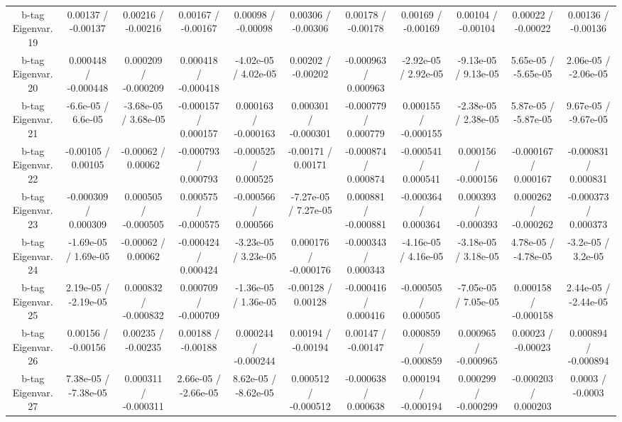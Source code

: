 \begin{table}[htbp]
\begin{center}
\begin{tabular}{|c|c|c|c|c|c|c|c|c|c|c|}
  b-tag Eigenvar. 19 & 0.00137 / -0.00137 & 0.00216 / -0.00216 & 0.00167 / -0.00167 & 0.00098 / -0.00098 & 0.00306 / -0.00306 & 0.00178 / -0.00178 & 0.00169 / -0.00169 & 0.00104 / -0.00104 & 0.00022 / -0.00022 & 0.00136 / -0.00136 \\ 
  b-tag Eigenvar. 20 & 0.000448 / -0.000448 & 0.000209 / -0.000209 & 0.000418 / -0.000418 & -4.02e-05 / 4.02e-05 & 0.00202 / -0.00202 & -0.000963 / 0.000963 & -2.92e-05 / 2.92e-05 & -9.13e-05 / 9.13e-05 & 5.65e-05 / -5.65e-05 & 2.06e-05 / -2.06e-05 \\ 
  b-tag Eigenvar. 21 & -6.6e-05 / 6.6e-05 & -3.68e-05 / 3.68e-05 & -0.000157 / 0.000157 & 0.000163 / -0.000163 & 0.000301 / -0.000301 & -0.000779 / 0.000779 & 0.000155 / -0.000155 & -2.38e-05 / 2.38e-05 & 5.87e-05 / -5.87e-05 & 9.67e-05 / -9.67e-05 \\ 
  b-tag Eigenvar. 22 & -0.00105 / 0.00105 & -0.00062 / 0.00062 & -0.000793 / 0.000793 & -0.000525 / 0.000525 & -0.00171 / 0.00171 & -0.000874 / 0.000874 & -0.000541 / 0.000541 & 0.000156 / -0.000156 & -0.000167 / 0.000167 & -0.000831 / 0.000831 \\ 
  b-tag Eigenvar. 23 & -0.000309 / 0.000309 & 0.000505 / -0.000505 & 0.000575 / -0.000575 & -0.000566 / 0.000566 & -7.27e-05 / 7.27e-05 & 0.000881 / -0.000881 & -0.000364 / 0.000364 & 0.000393 / -0.000393 & 0.000262 / -0.000262 & -0.000373 / 0.000373 \\ 
  b-tag Eigenvar. 24 & -1.69e-05 / 1.69e-05 & -0.00062 / 0.00062 & -0.000424 / 0.000424 & -3.23e-05 / 3.23e-05 & 0.000176 / -0.000176 & -0.000343 / 0.000343 & -4.16e-05 / 4.16e-05 & -3.18e-05 / 3.18e-05 & 4.78e-05 / -4.78e-05 & -3.2e-05 / 3.2e-05 \\ 
  b-tag Eigenvar. 25 & 2.19e-05 / -2.19e-05 & 0.000832 / -0.000832 & 0.000709 / -0.000709 & -1.36e-05 / 1.36e-05 & -0.00128 / 0.00128 & -0.000416 / 0.000416 & -0.000505 / 0.000505 & -7.05e-05 / 7.05e-05 & 0.000158 / -0.000158 & 2.44e-05 / -2.44e-05 \\ 
  b-tag Eigenvar. 26 & 0.00156 / -0.00156 & 0.00235 / -0.00235 & 0.00188 / -0.00188 & 0.000244 / -0.000244 & 0.00194 / -0.00194 & 0.00147 / -0.00147 & 0.000859 / -0.000859 & 0.000965 / -0.000965 & 0.00023 / -0.00023 & 0.000894 / -0.000894 \\ 
  b-tag Eigenvar. 27 & 7.38e-05 / -7.38e-05 & 0.000311 / -0.000311 & 2.66e-05 / -2.66e-05 & 8.62e-05 / -8.62e-05 & 0.000512 / -0.000512 & -0.000638 / 0.000638 & 0.000194 / -0.000194 & 0.000299 / -0.000299 & -0.000203 / 0.000203 & 0.0003 / -0.0003 \\ 

\end{tabular}
\end{center}
\end{table}
